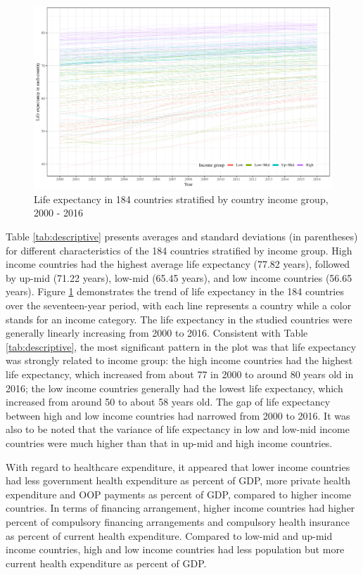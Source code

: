 \documentclass[]{elsarticle} %
\makeatletter
\def\maxwidth{\ifdim\Gin@nat@width>\linewidth\linewidth
\else\Gin@nat@width\fi}
\let\Oldincludegraphics\includegraphics
\renewcommand{\includegraphics}[1]{\Oldincludegraphics[width=\maxwidth]{#1}}
\makeatother
\begin{document}
\begin{figure}
\centering
\includegraphics{Figures/fig1.pdf}
\caption{\label{fig:fig1}Life expectancy in 184 countries stratified by country income group, 2000 - 2016}
\end{figure}

Table \ref{tab:descriptive} presents averages and standard deviations (in parentheses) for different characteristics of the 184 countries stratified by income group. High income countries had the highest average life expectancy (77.82 years), followed by up-mid (71.22 years), low-mid (65.45 years), and low income countries (56.65 years). Figure \ref{fig:fig1} demonstrates the trend of life expectancy in the 184 countries over the seventeen-year period, with each line represents a country while a color stands for an income category. The life expectancy in the studied countries were generally linearly increasing from 2000 to 2016. Consistent with Table \ref{tab:descriptive}, the most significant pattern in the plot was that life expectancy was strongly related to income group: the high income countries had the highest life expectancy, which increased from about 77 in 2000 to around 80 years old in 2016; the low income countries generally had the lowest life expectancy, which increased from around 50 to about 58 years old. The gap of life expectancy between high and low income countries had narrowed from 2000 to 2016. It was also to be noted that the variance of life expectancy in low and low-mid income countries were much higher than that in up-mid and high income countries.

With regard to healthcare expenditure, it appeared that lower income countries had less government health expenditure as percent of GDP, more private health expenditure and OOP payments as percent of GDP, compared to higher income countries. In terms of financing arrangement, higher income countries had higher percent of compulsory financing arrangements and compulsory health insurance as percent of current health expenditure. Compared to low-mid and up-mid income countries, high and low income countries had less population but more current health expenditure as percent of GDP.
\end{document}
